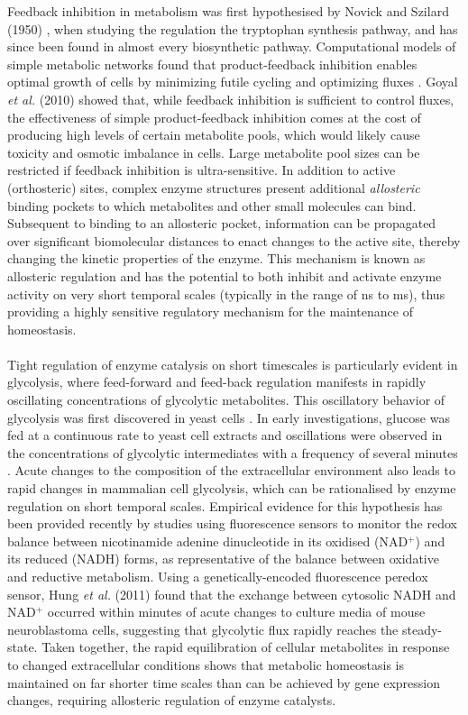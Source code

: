 Feedback inhibition in metabolism was first hypothesised by Novick and Szilard (1950) \cite{Novick:1950aa}, when studying the regulation the tryptophan synthesis pathway, and has since been found in almost every biosynthetic pathway. Computational models of simple metabolic networks found that product-feedback inhibition enables optimal growth of cells by minimizing futile cycling and optimizing fluxes \cite{Goyal:2010aa}. Goyal \textit{et al.} (2010) \cite{Goyal:2010aa} showed that, while feedback inhibition is sufficient to control fluxes, the effectiveness of simple product-feedback inhibition comes at the cost of producing high levels of certain metabolite pools, which would likely cause toxicity and osmotic imbalance in cells. Large metabolite pool sizes can be restricted if feedback inhibition is ultra-sensitive. In addition to active (orthosteric) sites, complex enzyme structures present additional \textit{allosteric} binding pockets to which metabolites and other small molecules can bind. Subsequent to binding to an allosteric pocket, information can be propagated over significant biomolecular distances to enact changes to the active site, thereby changing the kinetic properties of the enzyme. This mechanism is known as allosteric regulation and has the potential to both inhibit and activate enzyme activity on very short temporal scales (typically in the range of ns to ms), thus providing a highly sensitive regulatory mechanism for the maintenance of homeostasis. 
%
%
\\\\
%
%
Tight regulation of enzyme catalysis on short timescales is particularly evident in glycolysis, where feed-forward and feed-back regulation manifests in rapidly oscillating concentrations of glycolytic metabolites. This oscillatory behavior of glycolysis was first discovered in yeast cells \cite{Chance:1964aa}. In early investigations, glucose was fed at a continuous rate to yeast cell extracts and oscillations were observed in the concentrations of glycolytic intermediates with a frequency of several minutes \cite{Das:1991aa}. Acute changes to the composition of the extracellular environment also leads to rapid changes in mammalian cell glycolysis, which can be rationalised by enzyme regulation on short temporal scales. Empirical evidence for this hypothesis has been provided recently by studies using fluorescence sensors to monitor the redox balance between nicotinamide adenine dinucleotide in its oxidised (NAD$^{+}$) and its reduced (NADH) forms, as representative of the balance between oxidative and reductive metabolism. Using a genetically-encoded fluorescence peredox sensor, Hung \textit{et al.} (2011) \cite{Hung:2011aa} found that the exchange between cytosolic NADH and NAD$^{+}$ occurred within minutes of acute changes to culture media of mouse neuroblastoma cells, suggesting that glycolytic flux rapidly reaches the steady-state. Taken together, the rapid equilibration of cellular metabolites in response to changed extracellular conditions shows that metabolic homeostasis is maintained on far shorter time scales than can be achieved by gene expression changes, requiring allosteric regulation of enzyme catalysts.
